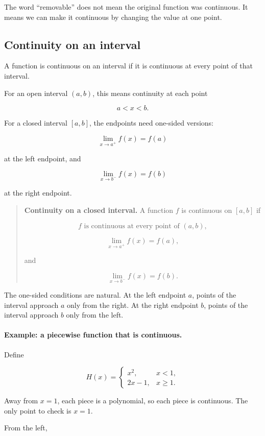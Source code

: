 The word ``removable'' does not mean the original function was continuous.  It means we can make it continuous by changing the value at one point.

\subsection{Continuity on an interval}
\label{subsec:continuity-on-interval}

A function is continuous on an interval if it is continuous at every point of that interval.

For an open interval \((a,b)\), this means continuity at each point

\[
a<x<b.
\]

For a closed interval \([a,b]\), the endpoints need one-sided versions:

\[
\lim_{x\to a^+}f(x)=f(a)
\]

at the left endpoint, and

\[
\lim_{x\to b^-}f(x)=f(b)
\]

at the right endpoint.

\begin{quote}
\textbf{Continuity on a closed interval.}
A function \(f\) is continuous on \([a,b]\) if

\[
f\text{ is continuous at every point of }(a,b),
\]

\[
\lim_{x\to a^+}f(x)=f(a),
\]

and

\[
\lim_{x\to b^-}f(x)=f(b).
\]
\end{quote}

The one-sided conditions are natural.  At the left endpoint \(a\), points of the interval approach \(a\) only from the right.  At the right endpoint \(b\), points of the interval approach \(b\) only from the left.

\paragraph{Example: a piecewise function that is continuous.}
Define

\[
H(x)=
\begin{cases}
x^2, & x<1,\\
2x-1, & x\ge1.
\end{cases}
\]

Away from \(x=1\), each piece is a polynomial, so each piece is continuous.  The only point to check is \(x=1\).

From the left,


